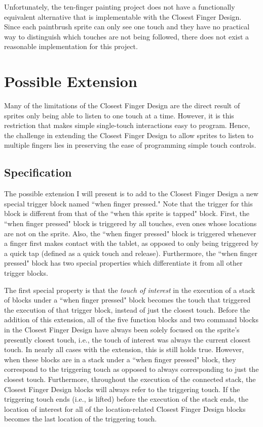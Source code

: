 Unfortunately, the ten-finger painting project does not have a functionally equivalent alternative that is implementable with the Closest Finger Design. Since each paintbrush sprite can only see one touch and they have no practical way to distinguish which touches are not being followed, there does not exist a reasonable implementation for this project.

\section{Possible Extension}

Many of the limitations of the Closest Finger Design are the direct result of sprites only being able to listen to one touch at a time. However, it is this restriction that makes simple single-touch interactions easy to program. Hence, the challenge in extending the Closest Finger Design to allow sprites to listen to multiple fingers lies in preserving the ease of programming simple touch controls.

\subsection{Specification}
The possible extension I will present is to add to the Closest Finger Design a new special trigger block  named ``when finger pressed." Note that the trigger for this block is different from that of the ``when this sprite is tapped" block. First, the ``when finger pressed" block is triggered by all touches, even ones whose locations are not on the sprite. Also, the ``when finger pressed" block is triggered whenever a finger first makes contact with the tablet, as opposed to only being triggered by a quick tap (defined as a quick touch and release). Furthermore, the ``when finger pressed"  block has two special properties which differentiate it from all other trigger blocks.

The first special property is that the \emph{touch of interest} in the execution of a stack of blocks under a ``when finger pressed" block becomes the touch that triggered the execution of that trigger block, instead of just the closest touch. Before the addition of this extension, all of the five function blocks and two command blocks in the Closest Finger Design have always been solely focused on the sprite's presently closest touch, i.e., the touch of interest was always the current closest touch. In nearly all cases with the extension, this is still holds true. However, when these blocks are in a stack under a ``when finger pressed" block, they correspond to the triggering touch as opposed to always corresponding to just the closest touch. Furthermore, throughout the execution of the connected stack, the Closest Finger Design blocks will always refer to the triggering touch. If the triggering touch ends (i.e., is lifted) before the execution of the stack ends, the location of interest for all of the location-related Closest Finger Design blocks becomes the last location of the triggering touch. 

